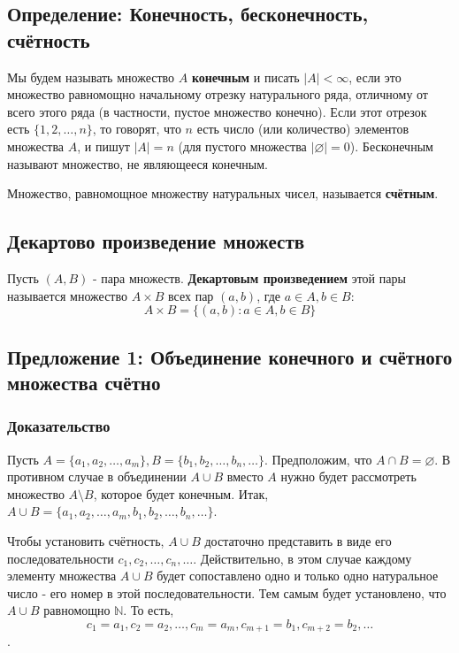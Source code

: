 \documentclass{article}
\begin{document}
\subsection{Определение: Конечность, бесконечность, счётность}

Мы будем называть множество $A$ \textbf{конечным} и писать $|A| < \infty$, если это множество равномощно начальному отрезку натурального ряда, отличному от всего этого ряда (в частности, пустое множество конечно). Если этот отрезок есть $\{1, 2, \dots, n\}$, то говорят, что $n$ есть число (или количество) элементов множества $A$, и пишут $|A| = n$ (для пустого множества $|\varnothing| = 0$). Бесконечным называют множество, не являющееся конечным.

Множество, равномощное множеству натуральных чисел, называется \textbf{счётным}.

\subsection{Декартово произведение множеств}

Пусть $(A, B)$ - пара множеств. \textbf{Декартовым произведением} этой пары называется множество $A \times B$ всех пар $(a, b)$, где $a \in A, b \in B$: \[
	A \times B = \{(a, b):a \in A, b \in B\}
\]

\subsection{Предложение 1: Объединение конечного и счётного множества счётно}
\subsubsection*{Доказательство}
Пусть $A = \{a_1, a_2, \dots, a_m\}, B = \{b_1, b_2, \dots, b_n, \dots\}$. Предположим, что $A \cap B = \varnothing$. В противном случае в объединении $A \cup B$ вместо $A$ нужно будет рассмотреть множество $A \setminus B$, которое будет конечным. Итак, $A \cup B = \{a_1, a_2, \dots, a_m, b_1, b_2, \dots, b_n, \dots\}$.

Чтобы установить счётность, $A \cup B$ достаточно представить в виде его последовательности $c_1, c_2, \dots, c_n, \dots$. Действительно, в этом случае каждому элементу множества $A \cup B$ будет сопоставлено одно и только одно натуральное число - его номер в этой последовательности. Тем самым будет установлено, что $A \cup B$ равномощно $\mathbb{N}$. То есть, \[c_1 = a_1, c_2 = a_2, \dots, c_m = a_m, c_{m+1} = b_1, c_{m+2} = b_2, \dots\].
\end{document}
